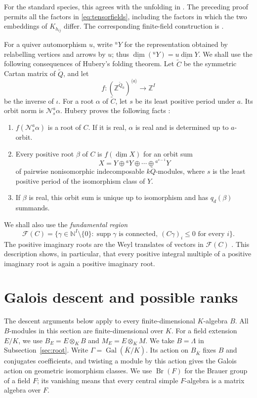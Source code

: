 \documentclass[11pt, reqno]{amsart}
\numberwithin{equation}{section}
\theoremstyle{definition}
\theoremstyle{remark}
\newcommand{\op}[1]{\operatorname{#1}}
\newcommand{\mb}[1]{\mathbb{#1}}
\newcommand{\mc}[1]{\mathcal{#1}}
\newcommand{\GG}{\Gamma}
\newcommand{\dimv}{\underline{\dim}}
\newcommand{\Gal}{\op{Gal}}
\newcommand{\Br}{\op{Br}}
\newcommand{\supp}{\op{supp}}
\newcommand{\Qbar}{\widetilde Q}
\newcommand{\Kbar}{\overline K}
\begin{document}
For the standard species, this agrees with the unfolding in
\cite[Lemma~3.3]{Pfeifer}. The preceding proof permits all the factors
in \eqref{eq:tensorfields}, including the factors in which the two
embeddings of $K_{h_{ij}}$ differ. The corresponding finite-field
construction is \cite[Proposition~6.3]{DengDu}.

For a quiver automorphism $u$, write ${}^uY$ for the representation
obtained by relabelling vertices and arrows by $u$; thus
$\dimv({}^uY)=u\dimv Y$. We shall use the following consequences of
Hubery's folding theorem. Let $\widetilde C$ be
the symmetric Cartan matrix of $\Qbar$, and let
\[ f:(\mb Z^{\Qbar_0})^{\langle a\rangle}\longrightarrow\mb Z^I \]
be the inverse of $\iota$.
For a root $\alpha$ of $\widetilde C$, let $s$ be its least positive
period under $a$. Its orbit norm is $\mc N_s^a\alpha$.
Hubery proves the following facts
\cite[Proposition~4 and Theorem~1]{Hubery}:
\begin{enumerate}
\item $f(\mc N_s^a\alpha)$ is a root of $C$. If it is real,
$\alpha$ is real and is determined up to $a$-orbit.
\item Every positive root $\beta$ of $C$ is $f(\dimv X)$ for an
orbit sum
\[ X=Y\oplus{}^aY\oplus\cdots\oplus{}^{a^{s-1}}Y \]
of pairwise nonisomorphic indecomposable $k\Qbar$-modules, where $s$
is the least positive period of the isomorphism class of $Y$.
\item If $\beta$ is real, this orbit sum is unique up to isomorphism
and has $q_d(\beta)$ summands.
\end{enumerate}
We shall also use the \emph{fundamental region}
\[ \mc F(C)=\{\gamma\in\mb N^I\setminus\{0\}:\supp\gamma\text{ is connected},\ (C\gamma)_i\leq0\text{ for every }i\}. \]
The positive imaginary roots are the Weyl translates of vectors in
$\mc F(C)$ \cite[Chapter~5]{KacBook}. This description shows, in
particular, that every positive integral multiple of a positive
imaginary root is again a positive imaginary root.


\section{Galois descent and possible ranks}\label{sec:descent}

The descent arguments below apply to every finite-dimensional
$K$-algebra $B$. All $B$-modules in this section are finite-dimensional
over $K$. For a field extension $E/K$, we use
$B_E=E\otimes_K B$ and $M_E=E\otimes_K M$. We take $B=\Lambda$ in Subsection~\ref{sec:root}. Write
$\GG=\Gal(\Kbar/K)$. Its action on $B_{\Kbar}$ fixes $B$ and
conjugates coefficients, and twisting a module by this action gives
the Galois action on geometric isomorphism classes. We use $\Br(F)$
for the Brauer group of a field $F$; its vanishing means that every
central simple $F$-algebra is a matrix algebra over $F$.
\end{document}
